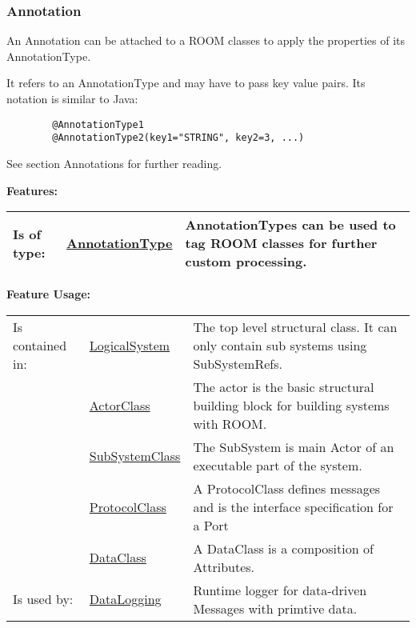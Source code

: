 \subsubsection{Annotation}
	\hypertarget{ref:Annotation}{}
	An Annotation can be attached to a ROOM classes to apply the properties of its AnnotationType.
		
	It refers to an AnnotationType and may have to pass key value pairs. Its notation is similar to Java:
	\begin{lstlisting}
		@AnnotationType1
		@AnnotationType2(key1="STRING", key2=3, ...)
	\end{lstlisting}
	
	See section Annotations for further reading.
		
		
	\begingroup
	\textbf{Features:}
	\renewcommand{\arraystretch}{1.8} %
	\begin{longtable}{l|l p{}}
		\hline
	Is of type: & \tabitem \hyperlink{ref:AnnotationType}{AnnotationType}  & AnnotationTypes can be used to tag ROOM classes for further custom processing.\\
	\hline
	\end{longtable}
	\endgroup
		
	\begingroup
	\textbf{Feature Usage:}
	\renewcommand{\arraystretch}{1.8} %
	\begin{longtable}{l|l p{}}
		\hline
	Is contained in: & \tabitem \hyperlink{ref:LogicalSystem}{LogicalSystem}  & The top level structural class. It can only contain sub systems using SubSystemRefs.\\
	& \tabitem \hyperlink{ref:ActorClass}{ActorClass}  & The actor is the basic structural building block for building systems with ROOM. \\
	& \tabitem \hyperlink{ref:SubSystemClass}{SubSystemClass}  & The SubSystem is main Actor of an executable part of the system.  \\
	& \tabitem \hyperlink{ref:ProtocolClass}{ProtocolClass}  & A ProtocolClass defines messages and is the interface specification for a Port \\
	& \tabitem \hyperlink{ref:DataClass}{DataClass}  & A DataClass is a composition of Attributes. \\
	\hline
	Is used by: & \tabitem \hyperlink{ref:DataLogging}{DataLogging}  & Runtime logger for data-driven Messages with primtive data.\\
	\hline
	\end{longtable}
	\endgroup
		
